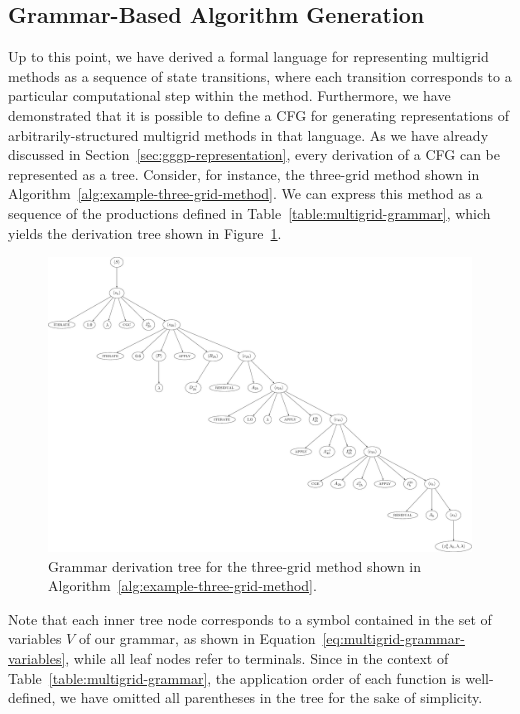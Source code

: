 \subsection{Grammar-Based Algorithm Generation}
\label{sec:grammar-based-algorithm-generation}
Up to this point, we have derived a formal language for representing multigrid methods as a sequence of state transitions, where each transition corresponds to a particular computational step within the method.
Furthermore, we have demonstrated that it is possible to define a CFG for generating representations of arbitrarily-structured multigrid methods in that language.
As we have already discussed in Section~\ref{sec:gggp-representation}, every derivation of a CFG can be represented as a tree.
Consider, for instance, the three-grid method shown in Algorithm~\ref{alg:example-three-grid-method}.
We can express this method as a sequence of the productions defined in Table~\ref{table:multigrid-grammar}, which yields the derivation tree shown in Figure~\ref{fig:example-three-grid-method-derivation-tree}.
\begin{figure}
	\centering
	\includegraphics[width=\textwidth]{figures/trees/three_grid_method_grammar_tree.pdf}
	\caption{Grammar derivation tree for the three-grid method shown in Algorithm~\ref{alg:example-three-grid-method}.}
	\label{fig:example-three-grid-method-derivation-tree}
\end{figure}
Note that each inner tree node corresponds to a symbol contained in the set of variables $V$ of our grammar, as shown in Equation~\eqref{eq:multigrid-grammar-variables}, while all leaf nodes refer to terminals.
Since in the context of Table~\ref{table:multigrid-grammar}, the application order of each function is well-defined, we have omitted all parentheses in the tree for the sake of simplicity.

